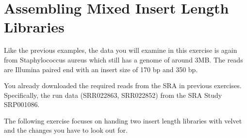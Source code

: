 \section{Assembling Mixed Insert Length Libraries}

\begin{note}
Like the previous examples, the data you will examine in this exercise is again
from Staphylococcus aureus which still has a genome of around 3MB. The reads are
Illumina paired end with an insert size of 170 bp and 350 bp.

You already downloaded the required reads from the SRA in previous exercises.
Specifically, the run data (SRR022863, SRR022852) from the SRA Study SRP001086.

\end{note}

\begin{information}
The following exercise focuses on handing two insert length libraries with
velvet and the changes you have to look out for.
\end{information}

